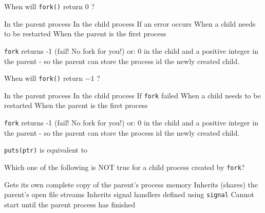 \variant
When will {\tt fork()} return $0$ ?
\begin{answers}
\answer In the parent process
\correctanswer In the child process
\answer If an error occurs
\answer When a child needs to be restarted
\answer When the parent is the first process
\end{answers}
\begin{solution}
{\tt fork} returns -1 (fail! No fork for you!) or: 0 in the child and a positive integer in the parent -  so the parent can store the process id the newly created child.
\end{solution}

\variant
When will {\tt fork()} return $-1$ ?
\begin{answers}
\answer In the parent process
\answer In the child process
\correctanswer If {\tt fork} failed
\answer When a child needs to be restarted
\answer When the parent is the first process
\end{answers}
\begin{solution}
{\tt fork} returns -1 (fail! No fork for you!) or: 0 in the child and a positive integer in the parent -  so the parent can store the process id the newly created child.
\end{solution}



\variant
{\tt puts(ptr)} is equivalent to
\begin{answers}
\end{answers}
\begin{solution}
\end{solution}



\variant
Which one of the following is NOT true for a child process created by {\tt fork}?
\begin{answers}
\answer Gets its own complete copy of the parent's process memory
\answer Inherits (shares) the parent's open file streams
\answer Inherits signal handlers defined using {\tt signal}
\correctanswer Cannot start until the parent process has finished
\end{answers}
\begin{solution}
\end{solution}






